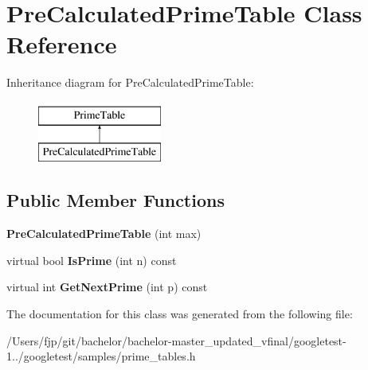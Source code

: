 \hypertarget{class_pre_calculated_prime_table}{}\section{Pre\+Calculated\+Prime\+Table Class Reference}
\label{class_pre_calculated_prime_table}
Inheritance diagram for Pre\+Calculated\+Prime\+Table\+:\begin{figure}[H]
\begin{center}
\leavevmode
\includegraphics[height=2.000000cm]{class_pre_calculated_prime_table}
\end{center}
\end{figure}
\subsection*{Public Member Functions}
\begin{DoxyCompactItemize}
\item 
\mbox{\label{class_pre_calculated_prime_table_a6bb947504421e31da70d2c71576be350}} 
{\bfseries Pre\+Calculated\+Prime\+Table} (int max)
\item 
\mbox{\label{class_pre_calculated_prime_table_a8a9ab7f99b09e5e987933c260e7304cf}} 
virtual bool {\bfseries Is\+Prime} (int n) const
\item 
\mbox{\label{class_pre_calculated_prime_table_a0ff10b1fe13df7e56b8d7ed9f41d3998}} 
virtual int {\bfseries Get\+Next\+Prime} (int p) const
\end{DoxyCompactItemize}


The documentation for this class was generated from the following file\+:\begin{DoxyCompactItemize}
\item 
/\+Users/fjp/git/bachelor/bachelor-\/master\+\_\+updated\+\_\+vfinal/googletest-\/1../googletest/samples/prime\+\_\+tables.\+h\end{DoxyCompactItemize}
